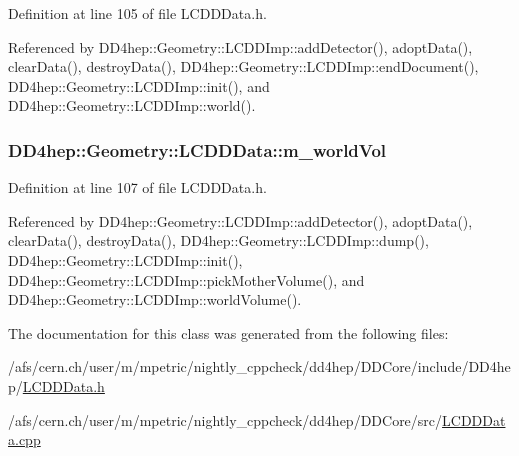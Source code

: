 Definition at line 105 of file LCDDData.h.

Referenced by DD4hep::Geometry::LCDDImp::addDetector(), adoptData(), clearData(), destroyData(), DD4hep::Geometry::LCDDImp::endDocument(), DD4hep::Geometry::LCDDImp::init(), and DD4hep::Geometry::LCDDImp::world().\hypertarget{class_d_d4hep_1_1_geometry_1_1_l_c_d_d_data_a42d6d627a9a04c95cda9bff9ef760abe}{
\subsubsection[{m\_\-worldVol}]{ {\bf DD4hep::Geometry::LCDDData::m\_\-worldVol}}}
\label{class_d_d4hep_1_1_geometry_1_1_l_c_d_d_data_a42d6d627a9a04c95cda9bff9ef760abe}


Definition at line 107 of file LCDDData.h.

Referenced by DD4hep::Geometry::LCDDImp::addDetector(), adoptData(), clearData(), destroyData(), DD4hep::Geometry::LCDDImp::dump(), DD4hep::Geometry::LCDDImp::init(), DD4hep::Geometry::LCDDImp::pickMotherVolume(), and DD4hep::Geometry::LCDDImp::worldVolume().

The documentation for this class was generated from the following files:\begin{DoxyCompactItemize}
\item 
/afs/cern.ch/user/m/mpetric/nightly\_\-cppcheck/dd4hep/DDCore/include/DD4hep/\hyperlink{_l_c_d_d_data_8h}{LCDDData.h}\item 
/afs/cern.ch/user/m/mpetric/nightly\_\-cppcheck/dd4hep/DDCore/src/\hyperlink{_l_c_d_d_data_8cpp}{LCDDData.cpp}\end{DoxyCompactItemize}
